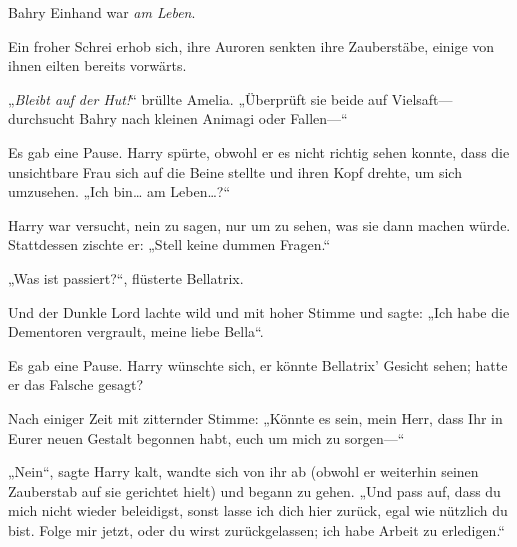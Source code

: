 Bahry Einhand war \emph{am Leben}.

Ein froher Schrei erhob sich, ihre Auroren senkten ihre Zauberstäbe, einige von ihnen eilten bereits vorwärts.

„\emph{Bleibt auf der Hut!}“ brüllte Amelia. „Überprüft sie beide auf Vielsaft—durchsucht Bahry nach kleinen Animagi oder Fallen—“

\later

 

Es gab eine Pause. Harry spürte, obwohl er es nicht richtig sehen konnte, dass die unsichtbare Frau sich auf die Beine stellte und ihren Kopf drehte, um sich umzusehen. „Ich bin… am Leben…?“

Harry war versucht, nein zu sagen, nur um zu sehen, was sie dann machen würde. Stattdessen zischte er: „Stell keine dummen Fragen.“

„Was ist passiert?“, flüsterte Bellatrix.

Und der Dunkle Lord lachte wild und mit hoher Stimme und sagte: „Ich habe die Dementoren vergrault, meine liebe Bella“.

Es gab eine Pause. Harry wünschte sich, er könnte Bellatrix' Gesicht sehen; hatte er das Falsche gesagt?

Nach einiger Zeit mit zitternder Stimme: „Könnte es sein, mein Herr, dass Ihr in Eurer neuen Gestalt begonnen habt, euch um mich zu sorgen—“

„Nein“, sagte Harry kalt, wandte sich von ihr ab (obwohl er weiterhin seinen Zauberstab auf sie gerichtet hielt) und begann zu gehen. „Und pass auf, dass du mich nicht wieder beleidigst, sonst lasse ich dich hier zurück, egal wie nützlich du bist. Folge mir jetzt, oder du wirst zurückgelassen; ich habe Arbeit zu erledigen.“

